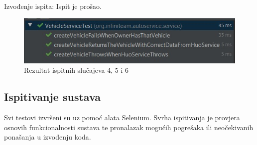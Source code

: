 			\noindent Izvođenje ispita: Ispit je prošao.
			
			\hfill
			\begin{figure}[H]
				\includegraphics[scale=0.7]{slike/test/vehicle.JPG}
				\centering
				\caption{Rezultat ispitnih slučajeva 4, 5 i 6}
				\label{fig:testvehicle}
			\end{figure}
			
			\subsection{Ispitivanje sustava}
			
			 
			
			Svi testovi izvršeni su uz pomoć alata Selenium. Svrha ispitivanja je provjera osnovih funkcionalnosti sustava te pronalazak mogućih pogrešaka ili neočekivanih ponašanja u izvođenju koda.
			
